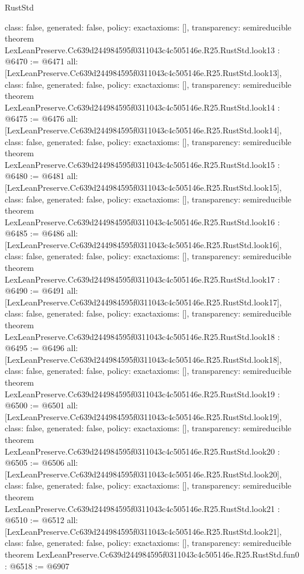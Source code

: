 \begin{lexlean}{RustStd}
\begin{coremodule}
{  class: false,
  generated: false,
  policy: exact{axioms: []},
  transparency: semireducible
}
theorem LexLeanPreserve.Cc639d244984595f0311043c4c505146e.R25.RustStd.look13 : @6470 := @6471 {
  all: [LexLeanPreserve.Cc639d244984595f0311043c4c505146e.R25.RustStd.look13],
  class: false,
  generated: false,
  policy: exact{axioms: []},
  transparency: semireducible
}
theorem LexLeanPreserve.Cc639d244984595f0311043c4c505146e.R25.RustStd.look14 : @6475 := @6476 {
  all: [LexLeanPreserve.Cc639d244984595f0311043c4c505146e.R25.RustStd.look14],
  class: false,
  generated: false,
  policy: exact{axioms: []},
  transparency: semireducible
}
theorem LexLeanPreserve.Cc639d244984595f0311043c4c505146e.R25.RustStd.look15 : @6480 := @6481 {
  all: [LexLeanPreserve.Cc639d244984595f0311043c4c505146e.R25.RustStd.look15],
  class: false,
  generated: false,
  policy: exact{axioms: []},
  transparency: semireducible
}
theorem LexLeanPreserve.Cc639d244984595f0311043c4c505146e.R25.RustStd.look16 : @6485 := @6486 {
  all: [LexLeanPreserve.Cc639d244984595f0311043c4c505146e.R25.RustStd.look16],
  class: false,
  generated: false,
  policy: exact{axioms: []},
  transparency: semireducible
}
theorem LexLeanPreserve.Cc639d244984595f0311043c4c505146e.R25.RustStd.look17 : @6490 := @6491 {
  all: [LexLeanPreserve.Cc639d244984595f0311043c4c505146e.R25.RustStd.look17],
  class: false,
  generated: false,
  policy: exact{axioms: []},
  transparency: semireducible
}
theorem LexLeanPreserve.Cc639d244984595f0311043c4c505146e.R25.RustStd.look18 : @6495 := @6496 {
  all: [LexLeanPreserve.Cc639d244984595f0311043c4c505146e.R25.RustStd.look18],
  class: false,
  generated: false,
  policy: exact{axioms: []},
  transparency: semireducible
}
theorem LexLeanPreserve.Cc639d244984595f0311043c4c505146e.R25.RustStd.look19 : @6500 := @6501 {
  all: [LexLeanPreserve.Cc639d244984595f0311043c4c505146e.R25.RustStd.look19],
  class: false,
  generated: false,
  policy: exact{axioms: []},
  transparency: semireducible
}
theorem LexLeanPreserve.Cc639d244984595f0311043c4c505146e.R25.RustStd.look20 : @6505 := @6506 {
  all: [LexLeanPreserve.Cc639d244984595f0311043c4c505146e.R25.RustStd.look20],
  class: false,
  generated: false,
  policy: exact{axioms: []},
  transparency: semireducible
}
theorem LexLeanPreserve.Cc639d244984595f0311043c4c505146e.R25.RustStd.look21 : @6510 := @6512 {
  all: [LexLeanPreserve.Cc639d244984595f0311043c4c505146e.R25.RustStd.look21],
  class: false,
  generated: false,
  policy: exact{axioms: []},
  transparency: semireducible
}
theorem LexLeanPreserve.Cc639d244984595f0311043c4c505146e.R25.RustStd.fun0 : @6518 := @6907 {
}
\end{coremodule}
\end{lexlean}
